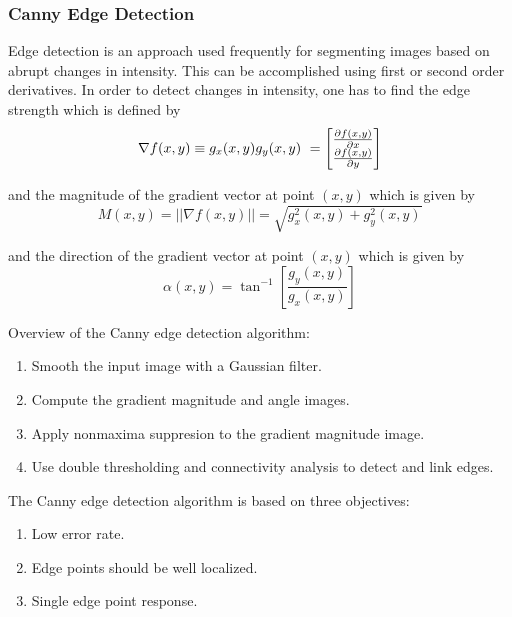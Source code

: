 
	
\subsubsection{Canny Edge Detection}
Edge detection is an approach used frequently for segmenting images based on abrupt changes in intensity. This can be accomplished using first or second order derivatives.  In order to detect changes in intensity, one has to find the edge strength which is defined by 
\begin{equation}
	\nabla f(x,y) \equiv  g_x(x,y) \\ g_y(x,y) \ = \begin{bmatrix} \frac{\partial f(x,y)}{\partial x} \\ \frac{\partial f(x,y)}{\partial y} \end{bmatrix} 
\end{equation}

and the magnitude of the gradient vector at point $(x,y)$ which is given by
\begin{equation}
	M(x,y) = ||\nabla f(x,y)|| = \sqrt{g_x^2(x,y)+g_y^2(x,y)}
\end{equation}

and the direction of the gradient vector at point $(x,y)$ which is given by \cite{gonzalez2018digitalChapter10.2}
\begin{equation}
	\alpha(x,y) = \tan^{-1}\left[\frac{g_y(x,y)}{g_x(x,y)}\right]
\end{equation}

 Overview of the Canny edge detection algorithm:
\begin{enumerate}
	\item Smooth the input image with a Gaussian filter.
	\item Compute the gradient magnitude and angle images.
	\item Apply nonmaxima suppresion to the gradient magnitude image.
	\item Use double thresholding and connectivity analysis to detect and link edges. 
\end{enumerate}

The Canny edge detection algorithm is based on three objectives:
\begin{enumerate}
	\item Low error rate. 
	\item Edge points should be well localized. 
	\item Single edge point response. 
\end{enumerate}

